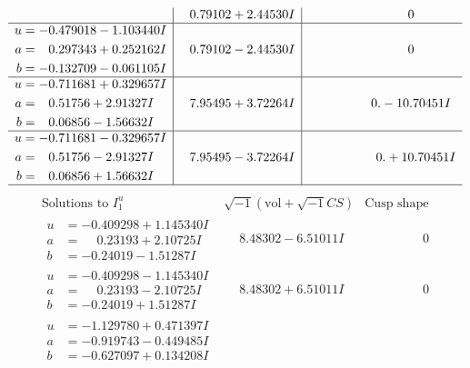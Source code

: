 \documentclass[1p]{elsarticle_modified}
\theoremstyle{definition}
\newcommand{\I}{\sqrt{-1}}
\begin{document}
$$\begin{array}{c|c|c}
 & \phantom{-}0.79102 + 2.44530 I & \phantom{-0.000000 } 0 \\ \hline\begin{aligned}
u &= -0.479018 - 1.103440 I \\
a &= \phantom{-}0.297343 + 0.252162 I \\
b &= -0.132709 - 0.061105 I\end{aligned}
 & \phantom{-}0.79102 - 2.44530 I & \phantom{-0.000000 } 0 \\ \hline\begin{aligned}
u &= -0.711681 + 0.329657 I \\
a &= \phantom{-}0.51756 + 2.91327 I \\
b &= \phantom{-}0.06856 - 1.56632 I\end{aligned}
 & \phantom{-}7.95495 + 3.72264 I & \phantom{-0.000000 } 0. - 10.70451 I \\ \hline\begin{aligned}
u &= -0.711681 - 0.329657 I \\
a &= \phantom{-}0.51756 - 2.91327 I \\
b &= \phantom{-}0.06856 + 1.56632 I\end{aligned}
 & \phantom{-}7.95495 - 3.72264 I & \phantom{-0.000000 -}0. + 10.70451 I\\
 \hline 
 \end{array}$$\newpage$$\begin{array}{c|c|c}  
\text{Solutions to }I^u_{1}& \I (\text{vol} + \sqrt{-1}CS) & \text{Cusp shape}\\
 \hline 
\begin{aligned}
u &= -0.409298 + 1.145340 I \\
a &= \phantom{-}0.23193 + 2.10725 I \\
b &= -0.24019 - 1.51287 I\end{aligned}
 & \phantom{-}8.48302 - 6.51011 I & \phantom{-0.000000 } 0 \\ \hline\begin{aligned}
u &= -0.409298 - 1.145340 I \\
a &= \phantom{-}0.23193 - 2.10725 I \\
b &= -0.24019 + 1.51287 I\end{aligned}
 & \phantom{-}8.48302 + 6.51011 I & \phantom{-0.000000 } 0 \\ \hline\begin{aligned}
u &= -1.129780 + 0.471397 I \\
a &= -0.919743 - 0.449485 I \\
b &= -0.627097 + 0.134208 I\end{aligned}

\end{array}$$
\end{document}
